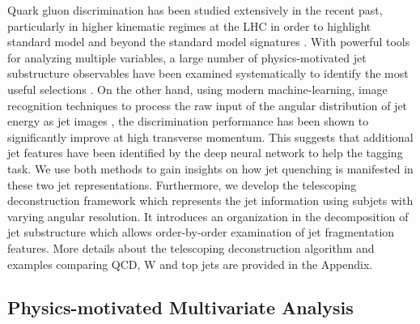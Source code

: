 \documentclass[notoc]{JHEP3}
\begin{document}
Quark gluon discrimination has been studied extensively in the recent past, particularly in higher kinematic regimes at the LHC in order to highlight standard model and beyond the standard model signatures \cite{}. With powerful tools for analyzing multiple variables, a large number of physics-motivated jet substructure observables have been examined systematically to identify the most useful selections \cite{Gallicchio:2011xq,Gallicchio:2012ez}. On the other hand, using modern machine-learning, image recognition techniques to process the raw input of the angular distribution of jet energy as jet images \cite{Komiske:2016rsd}, the discrimination performance has been shown to significantly improve at high transverse momentum. This suggests that additional jet features have been identified by the deep neural network to help the tagging task. We use both methods to gain insights on how jet quenching is manifested in these two jet representations. Furthermore, we develop the telescoping deconstruction framework which represents the jet information using subjets with varying angular resolution. It introduces an organization in the decomposition of jet substructure which allows order-by-order examination of jet fragmentation features. More details about the telescoping deconstruction algorithm and examples comparing QCD, W and top jets are provided in the Appendix.

\subsection{Physics-motivated Multivariate Analysis}
\label{sec:mva}
\end{document}
